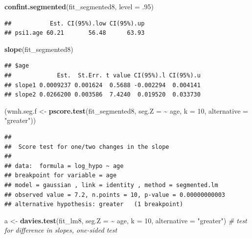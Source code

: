 \documentclass[
]{article}
\newenvironment{Shaded}{\begin{snugshade}}{\end{snugshade}}
\newcommand{\AttributeTok}[1]{\textcolor[rgb]{0.13,0.29,0.53}{#1}}
\newcommand{\CommentTok}[1]{\textcolor[rgb]{0.56,0.35,0.01}{\textit{#1}}}
\newcommand{\DecValTok}[1]{\textcolor[rgb]{0.00,0.00,0.81}{#1}}
\newcommand{\FunctionTok}[1]{\textcolor[rgb]{0.13,0.29,0.53}{\textbf{#1}}}
\newcommand{\NormalTok}[1]{#1}
\newcommand{\OtherTok}[1]{\textcolor[rgb]{0.56,0.35,0.01}{#1}}
\newcommand{\SpecialCharTok}[1]{\textcolor[rgb]{0.81,0.36,0.00}{\textbf{#1}}}
\newcommand{\StringTok}[1]{\textcolor[rgb]{0.31,0.60,0.02}{#1}}
\begin{document}
\begin{Shaded}
\begin{Highlighting}[]
\FunctionTok{confint.segmented}\NormalTok{(fit\_segmented8, }\AttributeTok{level =}\NormalTok{ .}\DecValTok{95}\NormalTok{)}
\end{Highlighting}
\end{Shaded}

\begin{verbatim}
##           Est. CI(95%).low CI(95%).up
## psi1.age 60.21       56.48      63.93
\end{verbatim}

\begin{Shaded}
\begin{Highlighting}[]
\FunctionTok{slope}\NormalTok{(fit\_segmented8)}
\end{Highlighting}
\end{Shaded}

\begin{verbatim}
## $age
##             Est.  St.Err. t value CI(95%).l CI(95%).u
## slope1 0.0009237 0.001624  0.5688 -0.002294  0.004141
## slope2 0.0266200 0.003586  7.4240  0.019520  0.033730
\end{verbatim}

\begin{Shaded}
\begin{Highlighting}[]
\NormalTok{(wmh.seg.f }\OtherTok{\textless{}{-}} \FunctionTok{pscore.test}\NormalTok{(fit\_segmented8, }\AttributeTok{seg.Z =} \SpecialCharTok{\textasciitilde{}}\NormalTok{ age, }\AttributeTok{k =} \DecValTok{10}\NormalTok{, }\AttributeTok{alternative =} \StringTok{"greater"}\NormalTok{))}
\end{Highlighting}
\end{Shaded}

\begin{verbatim}
## 
##  Score test for one/two changes in the slope
## 
## data:  formula = log_hypo ~ age 
## breakpoint for variable = age 
## model = gaussian , link = identity , method = segmented.lm
## observed value = 7.2, n.points = 10, p-value = 0.00000000003
## alternative hypothesis: greater   (1 breakpoint)
\end{verbatim}

\begin{Shaded}
\begin{Highlighting}[]
\NormalTok{a }\OtherTok{\textless{}{-}} \FunctionTok{davies.test}\NormalTok{(fit\_lm8, }\AttributeTok{seg.Z =} \SpecialCharTok{\textasciitilde{}}\NormalTok{ age, }\AttributeTok{k =} \DecValTok{10}\NormalTok{, }\AttributeTok{alternative =} \StringTok{"greater"}\NormalTok{)}
\CommentTok{\# test for difference in slopes, one{-}sided test}
\end{Highlighting}
\end{Shaded}
\end{document}
